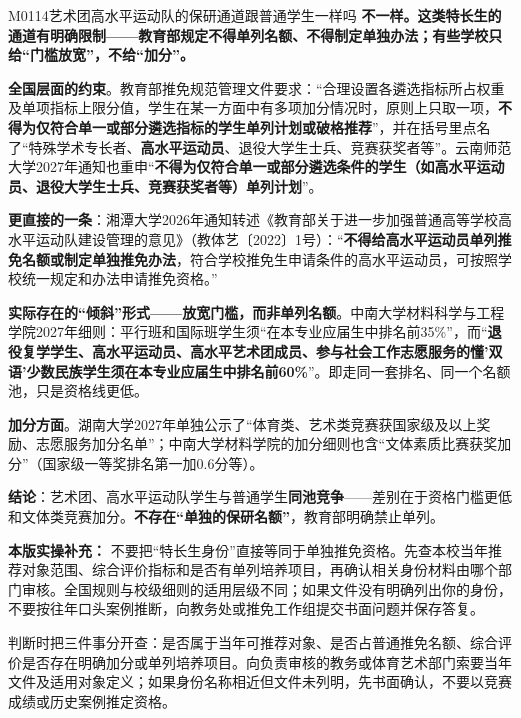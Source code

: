 \begin{qa}{M0114}{艺术团高水平运动队的保研通道跟普通学生一样吗}
\textbf{不一样。这类特长生的通道有明确限制——教育部规定不得单列名额、不得制定单独办法；有些学校只给“门槛放宽”，不给“加分”。}

\textbf{全国层面的约束}。教育部推免规范管理文件要求：“合理设置各遴选指标所占权重及单项指标上限分值，学生在某一方面中有多项加分情况时，原则上只取一项，\textbf{不得为仅符合单一或部分遴选指标的学生单列计划或破格推荐}”，并在括号里点名了“特殊学术专长者、\textbf{高水平运动员}、退役大学生士兵、竞赛获奖者等”。云南师范大学2027年通知也重申“\textbf{不得为仅符合单一或部分遴选条件的学生（如高水平运动员、退役大学生士兵、竞赛获奖者等）单列计划}”。

\textbf{更直接的一条}：湘潭大学2026年通知转述《教育部关于进一步加强普通高等学校高水平运动队建设管理的意见》（教体艺〔2022〕1号）：“\textbf{不得给高水平运动员单列推免名额或制定单独推免办法}，符合学校推免生申请条件的高水平运动员，可按照学校统一规定和办法申请推免资格。”

\textbf{实际存在的“倾斜”形式——放宽门槛，而非单列名额}。中南大学材料科学与工程学院2027年细则：平行班和国际班学生须“在本专业应届生中排名前35\%”，而“\textbf{退役复学学生、高水平运动员、高水平艺术团成员、参与社会工作志愿服务的懂'双语'少数民族学生须在本专业应届生中排名前60\%}”。即走同一套排名、同一个名额池，只是资格线更低。

\textbf{加分方面}。湖南大学2027年单独公示了“体育类、艺术类竞赛获国家级及以上奖励、志愿服务加分名单”；中南大学材料学院的加分细则也含“文体素质比赛获奖加分”（国家级一等奖排名第一加0.6分等）。

\textbf{结论}：艺术团、高水平运动队学生与普通学生\textbf{同池竞争}——差别在于资格门槛更低和文体类竞赛加分。\textbf{不存在“单独的保研名额”}，教育部明确禁止单列。
\par\textbf{本版实操补充：} 不要把“特长生身份”直接等同于单独推免资格。先查本校当年推荐对象范围、综合评价指标和是否有单列培养项目，再确认相关身份材料由哪个部门审核。全国规则与校级细则的适用层级不同；如果文件没有明确列出你的身份，不要按往年口头案例推断，向教务处或推免工作组提交书面问题并保存答复。

判断时把三件事分开查：是否属于当年可推荐对象、是否占普通推免名额、综合评价是否存在明确加分或单列培养项目。向负责审核的教务或体育艺术部门索要当年文件及适用对象定义；如果身份名称相近但文件未列明，先书面确认，不要以竞赛成绩或历史案例推定资格。
\end{qa}

